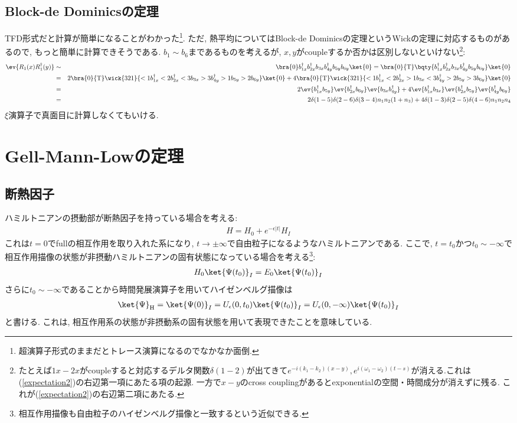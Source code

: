 \documentclass[10.5pt,a4paper]{jreport}
\begin{document}
\subsection{Block-de Dominicsの定理}
TFD形式だと計算が簡単になることがわかった\footnote{超演算子形式のままだとトレース演算になるのでなかなか面倒. }. ただ, 熱平均についてはBlock-de Dominicsの定理というWickの定理に対応するものがあるので, もっと簡単に計算できそうである. $b_1\sim b_6$まであるものを考えるが, $x, y$がcoupleするか否かは区別しないといけない\footnote{たとえば$1x-2x$がcoupleすると対応するデルタ関数$\delta(1-2)$が出てきて$e^{-i(k_1 - k_2)(x-y)}, e^{i(\omega_1 - \omega_2)(t-s)}$が消える.これは(\ref{expectation2})の右辺第一項にあたる項の起源. 一方で$x-y$のcross couplingがあるとexponentialの空間・時間成分が消えずに残る. これが(\ref{expectation2})の右辺第二項にあたる.}:
\begin{eqnarray}
  \ev{R_1(x)R_1^\dagger(y)} &\sim& \bra{0}b_{1x}^\dagger b^\dagger_{2x} b_{3x} b^\dagger_{4y} b_{5y} b_{6y} \ket{0} =\bra{0}{\rm T} \bqty{b_{1x}^\dagger b^\dagger_{2x} b_{3x} b^\dagger_{4y} b_{5y} b_{6y} }\ket{0}\\
  &=& 2\bra{0}{\rm T}\wick{321}{<1b_{1x}^\dagger <2b^\dagger_{2x} <3b_{3x} >3b^\dagger_{4y} >1b_{5y} >2b_{6y} }\ket{0} + 4\bra{0}{\rm T}\wick{321}{<1b_{1x}^\dagger <2b^\dagger_{2x} >1b_{3x} <3b^\dagger_{4y} >2b_{5y} >3b_{6y} }\ket{0}\\
  &=&2\ev{b^\dagger_{1x}b_{5y}}\ev{b^\dagger_{2x}b_{6y}}\ev{b_{3x}b^\dagger_{4y}} + 4\ev{b^\dagger_{1x}b_{3x}}\ev{b^\dagger_{2x}b_{5y}}\ev{b^\dagger_{4y}b_{6y}}\\
  \nonumber  &=& 2\delta(1-5)\delta(2-6)\delta(3-4)n_1n_2(1+n_3) + 4\delta(1-3)\delta(2-5)\delta(4-6)n_1n_2n_4\\
\end{eqnarray}
$\xi$演算子で真面目に計算しなくてもいける. 
\section{Gell-Mann-Lowの定理}
\subsection{断熱因子}
ハミルトニアンの摂動部が断熱因子を持っている場合を考える:
\begin{eqnarray}
  H = H_0 + e^{-\epsilon|t|}H_I
\end{eqnarray}
これは$t = 0$でfullの相互作用を取り入れた系になり, $t \rightarrow \pm\infty$で自由粒子になるようなハミルトニアンである. ここで, $t = t_0$かつ$t_0 \sim -\infty$で相互作用描像の状態が非摂動ハミルトニアンの固有状態になっている場合を考える\footnote{相互作用描像も自由粒子のハイゼンベルグ描像と一致するという近似できる. }:
\begin{eqnarray}
  H_0\ket{\Psi(t_0)}_I = E_0\ket{\Psi(t_0)}_I
\end{eqnarray}
さらに$t_0 \sim -\infty$であることから時間発展演算子を用いてハイゼンベルグ描像は
\begin{eqnarray}
  \ket{\Psi}_{\rm H} =  \ket{\Psi(0)}_I = U_\epsilon(0, t_0)\ket{\Psi(t_0)}_I= U_\epsilon(0, -\infty)\ket{\Psi(t_0)}_I\label{5eq1}
\end{eqnarray}
と書ける. これは, 相互作用系の状態が非摂動系の固有状態を用いて表現できたことを意味している.
\end{document}
